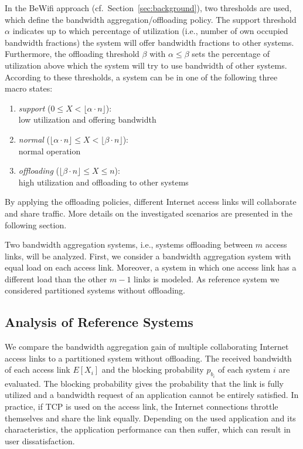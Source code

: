 In the BeWifi approach (cf.\ Section~\ref{sec:background}), two thresholds are used, which define the bandwidth aggregation/offloading policy. The support threshold $\alpha$ indicates up to which percentage of utilization (i.e., number of own occupied bandwidth fractions) the system will offer bandwidth fractions to other systems. Furthermore, the offloading threshold $\beta$ with $\alpha\leq\beta$ sets the percentage of utilization above which the system will try to use bandwidth of other systems. According to these thresholds, a system can be in one of the following three macro states:

\begin{enumerate}
	\item \textit{support} ($0 \leq X < \lfloor\alpha\cdot n\rfloor$):\\ low utilization and offering bandwidth
	\item \textit{normal} ($\lfloor\alpha\cdot n\rfloor \leq X < \lfloor\beta\cdot n\rfloor$):\\ normal operation
	\item \textit{offloading} ($\lfloor\beta\cdot n\rfloor \leq X \leq n$):\\ high utilization and offloading to other systems
\end{enumerate}

By applying the offloading policies, different Internet access links will collaborate and share traffic. More details on the investigated scenarios are presented in the following section.

Two bandwidth aggregation systems, i.e., systems offloading between $m$ access links, will be analyzed. First, we consider a bandwidth aggregation system with equal load on each access link. Moreover, a system in which one access link has a different load than the other $m-1$ links is modeled. As reference system we considered partitioned systems without offloading.%

\subsection{Analysis of Reference Systems}

We compare the bandwidth aggregation gain of multiple collaborating Internet access links to a partitioned system without offloading. %
The received bandwidth of each access link $E[X_i]$ and the blocking probability $p_{b_i}$ of each system $i$ are evaluated. The blocking probability gives the probability that the link is fully utilized and a bandwidth request of an application cannot be entirely satisfied. In practice, if TCP is used on the access link, the Internet connections throttle themselves and share the link equally. Depending on the used application and its characteristics, the application performance can then suffer, which can result in user dissatisfaction.


